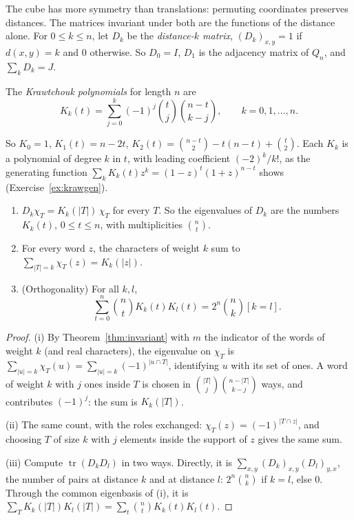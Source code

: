The cube has more symmetry than translations: permuting coordinates preserves distances. The matrices invariant under both are
the functions of the distance alone. For $0\le k\le n$, let $D_k$ be the \emph{distance-$k$ matrix}, $(D_k)_{x,y}=1$ if $d(x,y)=k$
and $0$ otherwise. So $D_0=I$, $D_1$ is the adjacency matrix of $Q_n$, and $\sum_kD_k=J$.

\begin{definition}\label{def:krawtchouk}
The \emph{Krawtchouk polynomials} for length $n$ are
\[
K_k(t)=\sum_{j=0}^k(-1)^j\binom tj\binom{n-t}{k-j},\qquad k=0,1,\dots,n.
\]
\end{definition}

So $K_0=1$, $K_1(t)=n-2t$, $K_2(t)=\binom{n-t}2-t(n-t)+\binom t2$. Each $K_k$ is a polynomial of degree $k$ in $t$, with leading
coefficient $(-2)^k/k!$, as the generating function $\sum_kK_k(t)z^k=(1-z)^t(1+z)^{n-t}$ shows (Exercise~\ref{ex:krawgen}).

\begin{theorem}\label{thm:krawtchouk}
\begin{enumerate}[label=(\roman*)]
\item $D_k\chi_T=K_k(|T|)\,\chi_T$ for every $T$. So the eigenvalues of $D_k$ are the numbers $K_k(t)$, $0\le t\le n$, with
multiplicities $\binom nt$.
\item For every word $z$, the characters of weight $k$ sum to $\sum_{|T|=k}\chi_T(z)=K_k(|z|)$.
\item (Orthogonality) For all $k,l$,
\[
\sum_{t=0}^n\binom ntK_k(t)K_l(t)=2^n\binom nk[k=l].
\]
\end{enumerate}
\end{theorem}
\begin{proof}
(i) By Theorem~\ref{thm:invariant} with $m$ the indicator of the words of weight $k$ (and real characters), the eigenvalue on
$\chi_T$ is $\sum_{|u|=k}\chi_T(u)=\sum_{|u|=k}(-1)^{|u\cap T|}$, identifying $u$ with its set of ones. A word of weight $k$ with
$j$ ones inside $T$ is chosen in $\binom{|T|}j\binom{n-|T|}{k-j}$ ways, and contributes $(-1)^j$: the sum is $K_k(|T|)$.

(ii) The same count, with the roles exchanged: $\chi_T(z)=(-1)^{|T\cap z|}$, and choosing $T$ of size $k$ with $j$ elements inside
the support of $z$ gives the same sum.

(iii) Compute $\operatorname{tr}(D_kD_l)$ in two ways. Directly, it is $\sum_{x,y}(D_k)_{x,y}(D_l)_{y,x}$, the number of pairs at
distance $k$ and at distance $l$: $2^n\binom nk$ if $k=l$, else $0$. Through the common eigenbasis of (i), it is
$\sum_TK_k(|T|)K_l(|T|)=\sum_t\binom ntK_k(t)K_l(t)$.
\end{proof}


